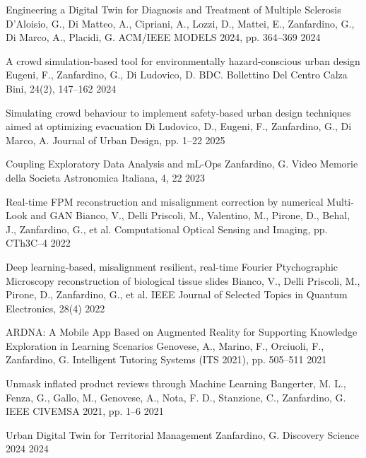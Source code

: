 

\newpage


\cvhonor
    {Engineering a Digital Twin for Diagnosis and Treatment of Multiple Sclerosis}
    {D'Aloisio, G., Di Matteo, A., Cipriani, A., Lozzi, D., Mattei, E., Zanfardino, G., Di Marco, A., Placidi, G.}
    {ACM/IEEE MODELS 2024, pp. 364–369}
    {2024}

\cvhonor
  {A crowd simulation-based tool for environmentally hazard-conscious urban design}
  {Eugeni, F., Zanfardino, G., Di Ludovico, D.}
  {BDC. Bollettino Del Centro Calza Bini, 24(2), 147–162}
  {2024}

\cvhonor
  {Simulating crowd behaviour to implement safety-based urban design techniques aimed at optimizing evacuation}
  {Di Ludovico, D., Eugeni, F., Zanfardino, G., Di Marco, A.}
  {Journal of Urban Design, pp. 1–22}
  {2025}

\cvhonor
  {Coupling Exploratory Data Analysis and mL-Ops}
  {Zanfardino, G.}
  {Video Memorie della Societa Astronomica Italiana, 4, 22}
  {2023}

\cvhonor
  {Real-time FPM reconstruction and misalignment correction by numerical Multi-Look and GAN}
  {Bianco, V., Delli Priscoli, M., Valentino, M., Pirone, D., Behal, J., Zanfardino, G., et al.}
  {Computational Optical Sensing and Imaging, pp. CTh3C–4}
  {2022}

\cvhonor
  {Deep learning-based, misalignment resilient, real-time Fourier Ptychographic Microscopy reconstruction of biological tissue slides}
  {Bianco, V., Delli Priscoli, M., Pirone, D., Zanfardino, G., et al.}
  {IEEE Journal of Selected Topics in Quantum Electronics, 28(4)}
  {2022}
  
\cvhonor
  {ARDNA: A Mobile App Based on Augmented Reality for Supporting Knowledge Exploration in Learning Scenarios}
  {Genovese, A., Marino, F., Orciuoli, F., Zanfardino, G.}
  {Intelligent Tutoring Systems (ITS 2021), pp. 505–511}
  {2021}

\cvhonor
  {Unmask inflated product reviews through Machine Learning}
  {Bangerter, M. L., Fenza, G., Gallo, M., Genovese, A., Nota, F. D., Stanzione, C., Zanfardino, G.}
  {IEEE CIVEMSA 2021, pp. 1–6}
  {2021}

\cvhonor
  {Urban Digital Twin for Territorial Management}
  {Zanfardino, G.}
  {Discovery Science 2024}
  {2024}


\nocite{*}


